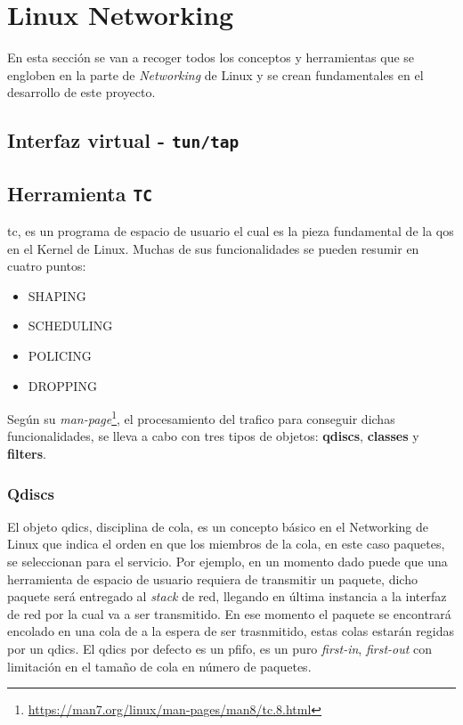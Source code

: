 \section{Linux Networking}
\label{sec:linuxNetworking}

En esta sección se van a recoger todos los conceptos y herramientas que se engloben en la parte de \textit{Networking} de Linux y se crean fundamentales en el desarrollo de este proyecto.




\subsection{Interfaz virtual - \texttt{tun/tap}}
\label{linuxNetworking_tuntap}




\subsection{Herramienta \texttt{TC}}


\gls{tc}, es un programa de espacio de usuario el cual es la pieza fundamental de la \gls{qos} en el Kernel de Linux. Muchas de sus funcionalidades se pueden resumir en cuatro puntos:

\begin{itemize}
    \item \textsc{SHAPING}
    \item \textsc{SCHEDULING}
    \item \textsc{POLICING}
    \item \textsc{DROPPING}
\end{itemize}

Según su \textit{man-page}\footnote{\url{https://man7.org/linux/man-pages/man8/tc.8.html}}, el procesamiento del trafico para conseguir dichas funcionalidades, se lleva a cabo con tres tipos de objetos: \textbf{qdiscs}, \textbf{classes} y \textbf{filters}.

\subsubsection{Qdiscs}

El objeto \gls{qdics}, disciplina de cola, es un concepto básico en el Networking de Linux que indica el orden en que los miembros de la cola, en este caso paquetes, se seleccionan para el servicio. Por ejemplo, en un momento dado puede que una herramienta de espacio de usuario requiera de transmitir un paquete, dicho paquete será entregado al \textit{stack} de red, llegando en última instancia a la interfaz de red por la cual va a ser transmitido. En ese momento el paquete se encontrará encolado en una cola de a la espera de ser trasnmitido, estas colas estarán regidas por un \gls{qdics}. El \gls{qdics} por defecto es un pfifo, es un puro \textit{first-in}, \textit{first-out} con limitación en el tamaño de cola en número de paquetes.


